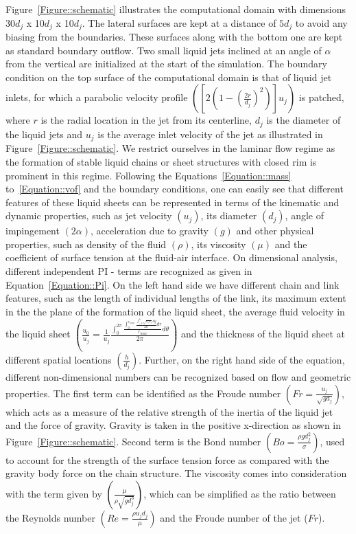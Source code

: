 \documentclass[%
aip,
sd,%
amsmath,amssymb,
preprint,%
author-year,%
]{revtex4-1}
\begin{document}
Figure~\ref{Figure::schematic} illustrates the computational domain with dimensions 30$d_j$ x 10$d_j$ x 10$d_j$. The lateral surfaces are kept at a distance of $5d_j$ to avoid any biasing from the boundaries. These surfaces along with the bottom one are kept as standard boundary outflow. Two small liquid jets inclined at an angle of $\alpha$ from the vertical are initialized at the start of the simulation. The boundary condition on the top surface of the computational domain is that of liquid jet inlets, for which a parabolic velocity profile $\left(\left[2\left(1 - \left(\frac{2r}{d_j}\right)^2\right) \right]u_j\right)$ is patched, where $r$ is the radial location in the jet from its centerline, $d_j$ is the diameter of the liquid jets and $u_j$ is the average inlet velocity of the jet as illustrated in Figure~\ref{Figure::schematic}. We restrict ourselves in the laminar flow regime as the formation of stable liquid chains or sheet structures with closed rim is prominent in this regime. Following the Equations~\ref{Equation::mass} to~\ref{Equation::vof} and the boundary conditions, one can easily see that different features of these liquid sheets can be represented in terms of the kinematic and dynamic properties, such as jet velocity $\left(u_j\right)$, its diameter $\left(d_j\right)$, angle of impingement $\left(2\alpha\right)$, acceleration due to gravity $\left(g\right)$ and other physical properties, such as density of the fluid $\left(\rho\right)$, its viscosity $\left(\mu\right)$ and the coefficient of surface tension at the fluid-air interface. On dimensional analysis, different independent PI - terms are recognized as given in Equation~\ref{Equation::Pi}. On the left hand side we have different chain and link features, such as the length of individual lengths of the link, its maximum extent in the the plane of the formation of the liquid sheet, the average fluid velocity in the liquid sheet $\left(\frac{u_0}{u_j} = \frac{1}{u_j}\frac{\int_{0}^{2\pi}\frac{\int_{0}^{r_{max}}\frac{\int_{-h}^{h}\sqrt{u_iu_i}dy}{2h}dr}{r_{max}}d\theta}{2\pi} \right)$ and the thickness of the liquid sheet at different spatial locations $\left(\frac{h}{d_j}\right)$. Further, on the right hand side of the equation, different non-dimensional numbers can be recognized based on flow and geometric properties. The first term can be identified as the Froude number $\left(Fr = \frac{u_j}{\sqrt{gd_j}}\right)$, which acts as a measure of the relative strength of the inertia of the liquid jet and the force of gravity. Gravity is taken in the positive x-direction as shown in Figure~\ref{Figure::schematic}. Second term is the Bond number $\left(Bo = \frac{\rho gd_j^2}{\sigma}\right)$, used to account for the strength of the surface tension force as compared with the gravity body force on the chain structure. The viscosity comes into consideration with the term given by $\left(\frac{\mu}{\rho\sqrt{gd_j^3}}\right)$, which can be simplified as the ratio between the Reynolds number $\left(Re = \frac{\rho u_jd_j}{\mu}\right)$ and the Froude number of the jet ($Fr$).
\end{document}
